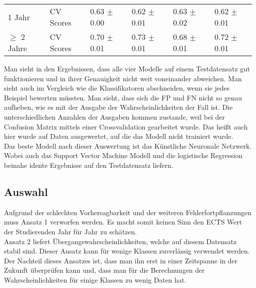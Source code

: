 \begin{table}[ht]
\begin{tabular}{ p{2cm} p{2cm} p{2cm} p{2cm} p{2cm} p{2cm} }
    \midrule
      1 Jahr & CV Scores & 0.63 $\pm$ 0.00 &0.62 $\pm$ 0.01 &0.63 $\pm$ 0.02 & 0.62 $\pm$ 0.01  \\
      $\geq$ 2 Jahre & CV Scores & 0.70 $\pm$ 0.01 &0.73 $\pm$ 0.01 &0.68 $\pm$ 0.01 & 0.72 $\pm$ 0.01 \\
    
    \bottomrule
    
  \end{tabular}
  
\end{table}

Man sieht in den Ergebnissen, dass alle vier Modelle auf einem Testdatensatz gut funktionieren und in ihrer Genauigkeit nicht weit voneinander 
abweichen. Man sieht auch im Vergleich wie die Klassifikatoren abschneiden, wenn sie jedes Beispiel bewerten m\"ussten. Man sieht, dass sich die FP und FN nicht 
so genau aufheben, wie es mit der Ausgabe der Wahrscheinlichkeiten der Fall ist. Die unterschiedlichen Anzahlen der Ausgaben kommen zustande, weil bei der Confusion Matrix
mittels einer Crossvalidation gearbeitet wurde. Das hei{\ss}t auch hier wurde auf Daten ausgewertet, auf die das Modell nicht trainiert wurde. \\

Das beste Modell nach dieser Auswertung ist das K\"unstliche Neuronale Netzwerk. Wobei auch das Support Vector Machine Modell und die logistische Regression beinahe
idente Ergebnisse auf den Testdatensatz liefern. \\







\subsection{Auswahl}
Aufgrund der schlechten Vorhersagbarkeit und der weiteren Fehlerfortpflanzungen muss Ansatz 1 verworfen werden. Es macht somit keinen Sinn den ECTS Wert 
der Studierenden Jahr f\"ur Jahr zu sch\"atzen. \\

Ansatz 2 liefert \"Ubergangswahrscheinlichkeiten, welche auf diesem Datensatz stabil sind. Dieser Ansatz kann f\"ur wenige Klassen zuverl\"assig verwendet werden.
Der Nachteil dieses Ansatzes ist, dass man ihn erst in einer Zeitspanne in der Zukunft \"uberpr\"ufen kann und, dass man f\"ur die Berechnungen der Wahrscheinlichkeiten 
f\"ur einige Klassen zu wenig Daten hat. \\

